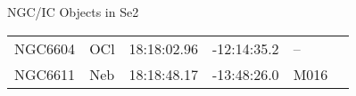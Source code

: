 \begin{block}{NGC/IC Objects in Se2}
  \centering
  \begin{tabularx}{\textwidth}{llrrll} \toprule 
    NGC6604 & OCl & 18:18:02.96 & -12:14:35.2  & -- \\ 
    NGC6611 & Neb & 18:18:48.17 & -13:48:26.0  & M016 \\ 
  \end{tabularx}
\end{block}